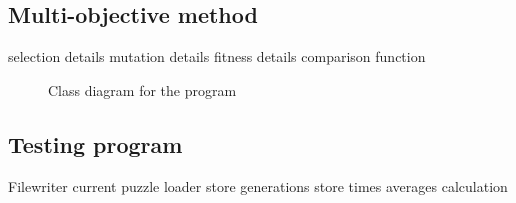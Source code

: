 \documentclass[a4paper,11pt]{article}
\begin{document}
\subsection{Multi-objective method}
selection details
mutation details
fitness details
comparison function


\begin{figure}[h]
	\caption{Class diagram for the program}
	\centering
\end{figure}

\subsection{Testing program }
Filewriter
current puzzle loader
store generations
store times
averages calculation
\end{document}
